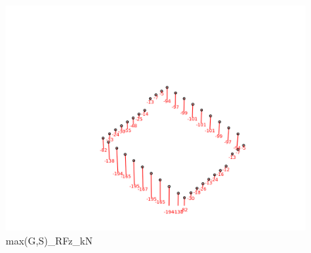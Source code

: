     \begin{figure}[H] %
        \centering %
        \includegraphics[width=\textwidth]{assets/img/graph3D_charges_cas_5_RFz_kN.png} %
        \caption{max(G,S)\_RFz\_kN} %
    \end{figure}

    